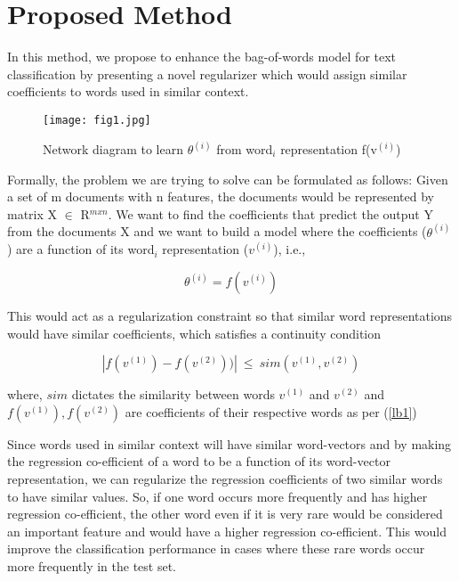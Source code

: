 \section{Proposed Method}

In this method, we propose to enhance the bag-of-words model for text classification by presenting a novel regularizer which would assign similar coefficients to words used in similar context.

\begin{figure}
\centering
\texttt{[image: fig1.jpg]}\\
\centering
\caption{Network diagram to learn $\theta^{(i)}$ from word$_{i}$ representation f(v$^{(i)}$)}
\label{fig:foo}
\end{figure}

Formally, the problem we are trying to solve can be formulated as follows: Given a set of m documents with n features, the documents would be represented by matrix X $\in$ R$^{m x n}$. We want to find the coefficients that predict the output Y from the documents X and we want to build a model where the coefficients ($\theta^{(i)}$) are a function of its word$_{i}$ representation ($v^{(i)}$), i.e.,

\begin{equation}\label{lb1}
\theta^{(i)} = f(v^{(i)})
\end{equation}

This would act as a regularization constraint so that similar word representations would have similar coefficients, which satisfies a continuity condition

\begin{equation}
|f(v^{(1)}) - f(v^{(2)}))|\ \leq\ sim(v^{(1)}, v^{(2)})
\end{equation}

where, $sim$ dictates the similarity between words $v^{(1)}$ and $v^{(2)}$ and $ f(v^{(1)}), f(v^{(2)})$ are coefficients of their respective words as per (\ref{lb1})


Since words used in similar context will have similar word-vectors and by making the regression co-efficient of a word to be a function of its word-vector representation, we can regularize the regression coefficients of two similar words to have similar values. So, if one word occurs more frequently and has higher regression co-efficient, the other word even if it is very rare would be considered an important feature and would have a higher regression co-efficient. This would improve the classification performance in cases where these rare words occur more frequently in the test set.\\

